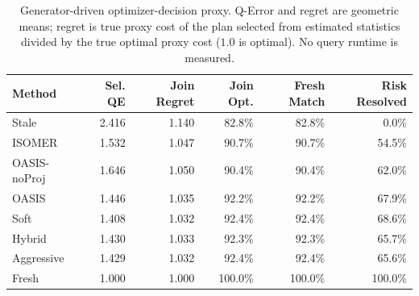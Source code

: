 \begin{table}[t]
  \centering
  \small
  \caption{Generator-driven optimizer-decision proxy. Q-Error and regret are geometric means; regret is true proxy cost of the plan selected from estimated statistics divided by the true optimal proxy cost ($1.0$ is optimal). No query runtime is measured.}
  \label{tab:optimizer_decision_proxy}
  \setlength{\tabcolsep}{4pt}
  \begin{tabular}{lrrrrr}
    \toprule
    Method & Sel. QE & Join Regret & Join Opt. & Fresh Match & Risk Resolved \\
    \midrule
    Stale & 2.416 & 1.140 & 82.8\% & 82.8\% & 0.0\% \\
    ISOMER & 1.532 & 1.047 & 90.7\% & 90.7\% & 54.5\% \\
    OASIS-noProj & 1.646 & 1.050 & 90.4\% & 90.4\% & 62.0\% \\
    OASIS & 1.446 & 1.035 & 92.2\% & 92.2\% & 67.9\% \\
    Soft & 1.408 & 1.032 & 92.4\% & 92.4\% & 68.6\% \\
    Hybrid & 1.430 & 1.033 & 92.3\% & 92.3\% & 65.7\% \\
    Aggressive & 1.429 & 1.032 & 92.4\% & 92.4\% & 65.6\% \\
    Fresh & 1.000 & 1.000 & 100.0\% & 100.0\% & 100.0\% \\
    \bottomrule
  \end{tabular}
\end{table}
